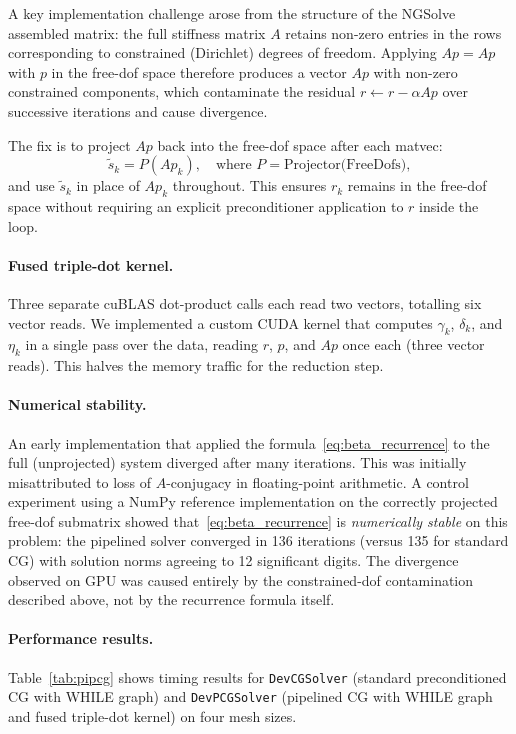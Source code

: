 A key implementation challenge arose from the structure of the NGSolve assembled
matrix: the full stiffness matrix $A$ retains non-zero entries in the rows
corresponding to constrained (Dirichlet) degrees of freedom.
Applying $Ap = A p$ with $p$ in the free-dof space therefore produces a vector
$Ap$ with non-zero constrained components, which contaminate the residual
$r \leftarrow r - \alpha Ap$ over successive iterations and cause divergence.

The fix is to project $Ap$ back into the free-dof space after each matvec:
\[
  \tilde{s}_k = P(Ap_k), \quad \text{where } P = \text{Projector(FreeDofs)},
\]
and use $\tilde{s}_k$ in place of $Ap_k$ throughout.
This ensures $r_k$ remains in the free-dof space without requiring an explicit
preconditioner application to $r$ inside the loop.

\paragraph{Fused triple-dot kernel.}
Three separate cuBLAS dot-product calls each read two vectors, totalling
six vector reads.  We implemented a custom CUDA kernel that computes
$\gamma_k$, $\delta_k$, and $\eta_k$ in a single pass over the data,
reading $r$, $p$, and $Ap$ once each (three vector reads).
This halves the memory traffic for the reduction step.

\paragraph{Numerical stability.}
An early implementation that applied the formula~\eqref{eq:beta_recurrence}
to the full (unprojected) system diverged after many iterations.
This was initially misattributed to loss of $A$-conjugacy in floating-point arithmetic.
A control experiment using a NumPy reference implementation on the correctly
projected free-dof submatrix showed that~\eqref{eq:beta_recurrence} is
\emph{numerically stable} on this problem: the pipelined solver converged in
136 iterations (versus 135 for standard CG) with solution norms agreeing to
12 significant digits.
The divergence observed on GPU was caused entirely by the constrained-dof
contamination described above, not by the recurrence formula itself.

\paragraph{Performance results.}
Table~\ref{tab:pipcg} shows timing results for \texttt{DevCGSolver} (standard
preconditioned CG with WHILE graph) and \texttt{DevPCGSolver} (pipelined CG
with WHILE graph and fused triple-dot kernel) on four mesh sizes.

